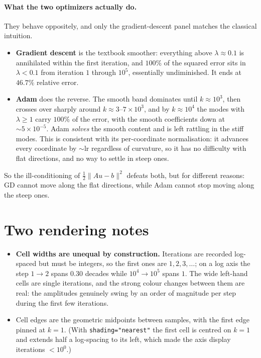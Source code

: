 \documentclass[11pt]{article}
\begin{document}
\paragraph{What the two optimizers actually do.} They behave oppositely, and only the
gradient-descent panel matches the classical intuition.
\begin{itemize}
   \item \textbf{Gradient descent} is the textbook smoother: everything above $\lambda\approx0.1$
   is annihilated within the first iteration, and $100\%$ of the squared error sits in
   $\lambda<0.1$ from iteration $1$ through $10^5$, essentially undiminished. It ends at $46.7\%$
   relative error.
   \item \textbf{Adam} does the reverse. The smooth band dominates until $k\approx10^3$, then
   crosses over sharply around $k\approx3$--$7\times10^3$, and by $k\approx10^4$ the modes with
   $\lambda\ge1$ carry $100\%$ of the error, with the smooth coefficients down at $\sim5\times10^{-5}$.
   Adam \emph{solves} the smooth content and is left rattling in the stiff modes. This is
   consistent with its per-coordinate normalisation: it advances every coordinate by
   $\sim\mathrm{lr}$ regardless of curvature, so it has no difficulty with flat directions, and no
   way to settle in steep ones.
\end{itemize}
So the ill-conditioning of $\tfrac12\|Au-b\|^2$ defeats both, but for different reasons: GD cannot
move along the flat directions, while Adam cannot stop moving along the steep ones.

\section*{Two rendering notes}

\begin{itemize}
   \item \textbf{Cell widths are unequal by construction.} Iterations are recorded log-spaced but
   must be integers, so the first ones are $1,2,3,\dots$; on a log axis the step $1\!\to\!2$ spans
   $0.30$ decades while $10^4\!\to\!10^5$ spans $1$. The wide left-hand cells are single
   iterations, and the strong colour changes between them are real: the amplitudes genuinely
   swing by an order of magnitude per step during the first few iterations.
   \item Cell edges are the geometric midpoints between samples, with the first edge pinned at
   $k=1$. (With \texttt{shading="nearest"} the first cell is centred on $k=1$ and extends half a
   log-spacing to its left, which made the axis display iterations $<10^0$.)
\end{itemize}
\end{document}
